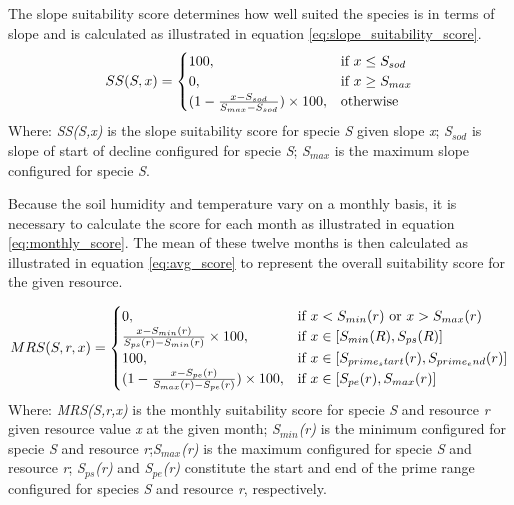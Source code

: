 The slope suitability score determines how well suited the species is in terms of slope and is calculated as illustrated in equation \ref{eq:slope_suitability_score}.\\

\begin{equation}
\centering
SS(S,x) = 
\begin{cases}
    100, & \text{if } x \leq S_{sod} \\
    0, & \text{if } x \geq S_{max} \\
	(1-\frac{x-S_{sod}}{S_{max}-S_{sod}}) \times 100, & \text{otherwise}
\end{cases}
\label{eq:slope_suitability_score}
\end{equation}
Where: \textit{SS(S,x)} is the slope suitability score for specie \textit{S} given slope \textit{x}; \textit{S$_{sod}$} is slope of start of decline configured for specie \textit{S}; \textit{S$_{max}$} is the maximum slope configured for specie \textit{S}.

Because the soil humidity and temperature vary on a monthly basis, it is necessary to calculate the score for each month as illustrated in equation \ref{eq:monthly_score}. The mean of these twelve months is then calculated as illustrated in equation \ref{eq:avg_score} to represent the overall suitability score for the given resource.

\begin{equation}
\centering
MRS(S,r,x) = 
\begin{cases}
    0, & \text{if } x < S_{min}(r) \text{ or } x > S_{max}(r) \\
    \frac{x - S_{min}(r)}{S_{ps}(r) - S_{min}(r)} \times 100, & \text{if } x \in [S_{min}(R),S_{ps}(R)] \\
    100, & \text{if } x \in [S_{prime_start}(r),S_{prime_end}(r)] \\
    (1 - \frac{x - S_{pe}(r)}{S_{max}(r)-S_{pe}(r)}) \times 100, & \text{if } x \in [S_{pe}(r),S_{max}(r)] \\
\end{cases}
\label{eq:monthly_score}
\end{equation}
Where: \textit{MRS(S,r,x)} is the monthly suitability score for specie \textit{S} and resource \textit{r} given resource value \textit{x} at the given month; \textit{S$_{min}$(r)} is the minimum configured for specie \textit{S} and resource \textit{r};\textit{S$_{max}$(r)} is the maximum configured for specie \textit{S} and resource \textit{r}; \textit{S$_{ps}$(r)} and \textit{S$_{pe}$(r)} constitute the start and end of the prime range configured for species \textit{S} and resource \textit{r}, respectively.\\

